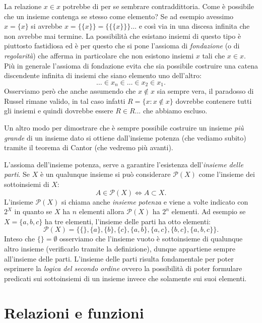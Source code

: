 \documentclass[italian,a4paper,hidelinks]{scrartcl}
\renewcommand{\P}{{\mathcal P}}
\newcommand{\myemph}[1]{\emph{#1}\marginpar{#1}}
\begin{document}
La relazione $x\in x$ potrebbe di per se sembrare contraddittoria.
Come è possibile che un insieme contenga se stesso come elemento?
Se ad esempio avessimo $x=\{ x\}$ si avrebbe $x=\{\{x\}\} = \{\{\{ x\}\}\} \dots$
e così via in una discesa infinita che non avrebbe mai termine.
La possibilità che esistano insiemi di questo tipo è piuttosto fastidiosa ed è per questo
che si pone l'assioma di \emph{fondazione} (o di \emph{regolarità}) che afferma
in particolare che non esistono insiemi $x$ tali che $x\in x$.
Più in generale l'assioma di fondazione evita che sia possibile
costruire una catena discendente infinita di insiemi che siano
elemento uno dell'altro:
\[
  \dots \in x_n \in \dots \in x_2 \in x_1.
\]
Osserviamo però che anche assumendo che $x\not\in x$ sia sempre vera,
il paradosso di Russel rimane valido, in tal caso infatti
$R=\{x\colon x\not \in x\}$ dovrebbe contenere
tutti gli insiemi e quindi dovrebbe essere $R\in R$... che abbiamo escluso.

Un altro modo per dimostrare che è sempre possibile costruire un
insieme \emph{più grande} di un insieme dato si ottiene dall'insieme potenza
(che vediamo subito) tramite il teorema di Cantor (che vedremo più avanti).

L'assioma dell'insieme potenza, serve
a garantire l'esistenza del\-l'\myemph{insieme delle parti}.
Se $X$ è un qualunque insieme si può considerare $\P(X)$ come l'insieme dei
sottoinsiemi di $X$:
\[
 A \in \P(X) \iff A \subset X.
\]
L'insieme $\P(X)$ si chiama anche \emph{insieme potenza} e viene a volte indicato con $2^X$
in quanto se $X$ ha $n$ elementi allora $\P(X)$ ha $2^n$ elementi.
Ad esempio se $X=\{a, b, c\}$ ha tre elementi, l'insieme delle parti
ha otto elementi:
\[
 \P(X) = \{ \{\}, \{a\}, \{b\}, \{c\}, \{a,b\},
   \{a,c\}, \{b,c\}, \{a,b,c\}\}.
\]
Inteso che $\{\}=\emptyset$ osserviamo che l'insieme vuoto è sottoinsieme di
qualunque altro insieme (verificarlo tramite la definizione),
dunque appartiene sempre all'insieme delle parti.
L'insieme delle parti risulta fondamentale per poter esprimere
la \emph{logica del secondo ordine} ovvero la possibilità di poter
formulare predicati sui sottoinsiemi di un insieme invece che solamente
sui suoi elementi.

\section{Relazioni e funzioni}
\end{document}
